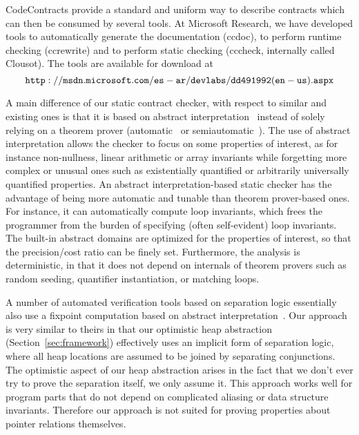 \documentclass{llncs}
\begin{document}
CodeContracts provide a standard and uniform way to describe contracts which can then be consumed by several tools. 
At Microsoft Research, we have developed  tools to automatically generate the documentation (ccdoc), to perform runtime checking (ccrewrite) and to perform static checking (cccheck, internally called Clousot).
The tools are available for download at
\[ \mathtt{http://msdn.microsoft.com/es-ar/devlabs/dd491992(en-us).aspx}\]

A main difference of our static contract checker, with respect to
similar and existing ones is that it is based on abstract
interpretation~\cite{CousotCousot77-1-POPL} instead of solely relying
on a theorem prover (automatic~\cite{ESCJava,LeinoBoogie,Why} or
semiautomatic~\cite{Jack}).  The use of abstract interpretation allows
the checker to focus on some properties of interest, as for instance
non-nullness, linear arithmetic or array invariants while forgetting
more complex or unusual ones such as existentially
quantified or arbitrarily universally quantified properties.  An
abstract interpretation-based static checker has the advantage of
being more automatic and tunable than theorem prover-based ones.  For
instance, it can automatically compute loop invariants, which frees
the programmer from the burden of specifying (often self-evident) loop
invariants.  The built-in abstract domains are optimized for the
properties of interest, so that the precision/cost ratio can be finely
set.  Furthermore, the analysis is deterministic, in that it does not
depend on internals of theorem provers such as random seeding,
quantifier instantiation, or matching loops.

A number of automated verification tools based on separation logic
essentially also use a fixpoint computation based on abstract
interpretation~\cite{verifast,vericool,jstar}. Our approach is very similar to theirs in that our
optimistic heap abstraction (Section~\ref{sec:framework}) effectively
uses an implicit form of separation logic, where all heap locations
are assumed to be joined by separating conjunctions. The optimistic
aspect of our heap abstraction arises in the fact that we don't ever
try to prove the separation itself, we only assume it. This approach
works well for program parts that do not depend on complicated
aliasing or data structure invariants. Therefore our approach is not suited for proving
properties about pointer relations themselves.
\end{document}

